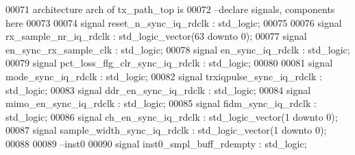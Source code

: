 \begin{DoxyCode}
00071 \textcolor{keywordflow}{architecture} arch \textcolor{keywordflow}{of} tx_path_top is
00072 \textcolor{keyword}{--declare signals,  components here}
00073 
00074 \textcolor{keywordflow}{signal} \textcolor{vhdlchar}{reset_n_sync_iq_rdclk}        \textcolor{vhdlchar}{:} \textcolor{comment}{std\_logic};
00075 
00076 \textcolor{keywordflow}{signal} \textcolor{vhdlchar}{rx_sample_nr_iq_rdclk}        \textcolor{vhdlchar}{:} \textcolor{comment}{std\_logic\_vector}\textcolor{vhdlchar}{(}\textcolor{vhdllogic}{}\textcolor{vhdllogic}{63} \textcolor{keywordflow}{downto} \textcolor{vhdllogic}{}\textcolor{vhdllogic}{0}\textcolor{vhdlchar}{)};
00077 \textcolor{keywordflow}{signal} \textcolor{vhdlchar}{en_sync_rx_sample_clk}        \textcolor{vhdlchar}{:} \textcolor{comment}{std\_logic};
00078 \textcolor{keywordflow}{signal} \textcolor{vhdlchar}{en_sync_iq_rdclk}             \textcolor{vhdlchar}{:} \textcolor{comment}{std\_logic};
00079 \textcolor{keywordflow}{signal} \textcolor{vhdlchar}{pct_loss_flg_clr_sync_iq_rdclk} \textcolor{vhdlchar}{:} \textcolor{comment}{std\_logic};
00080 
00081 \textcolor{keywordflow}{signal} \textcolor{vhdlchar}{mode_sync_iq_rdclk}           \textcolor{vhdlchar}{:} \textcolor{comment}{std\_logic};
00082 \textcolor{keywordflow}{signal} \textcolor{vhdlchar}{trxiqpulse_sync_iq_rdclk}     \textcolor{vhdlchar}{:} \textcolor{comment}{std\_logic}; 
00083 \textcolor{keywordflow}{signal} \textcolor{vhdlchar}{ddr_en_sync_iq_rdclk}         \textcolor{vhdlchar}{:} \textcolor{comment}{std\_logic};
00084 \textcolor{keywordflow}{signal} \textcolor{vhdlchar}{mimo_en_sync_iq_rdclk}        \textcolor{vhdlchar}{:} \textcolor{comment}{std\_logic};
00085 \textcolor{keywordflow}{signal} \textcolor{vhdlchar}{fidm_sync_iq_rdclk}           \textcolor{vhdlchar}{:} \textcolor{comment}{std\_logic};
00086 \textcolor{keywordflow}{signal} \textcolor{vhdlchar}{ch_en_sync_iq_rdclk}          \textcolor{vhdlchar}{:} \textcolor{comment}{std\_logic\_vector}\textcolor{vhdlchar}{(}\textcolor{vhdllogic}{}\textcolor{vhdllogic}{1} \textcolor{keywordflow}{downto} \textcolor{vhdllogic}{}\textcolor{vhdllogic}{0}\textcolor{vhdlchar}{)};
00087 \textcolor{keywordflow}{signal} \textcolor{vhdlchar}{sample_width_sync_iq_rdclk}   \textcolor{vhdlchar}{:} \textcolor{comment}{std\_logic\_vector}\textcolor{vhdlchar}{(}\textcolor{vhdllogic}{}\textcolor{vhdllogic}{1} \textcolor{keywordflow}{downto} \textcolor{vhdllogic}{}\textcolor{vhdllogic}{0}\textcolor{vhdlchar}{)};
00088 
00089 \textcolor{keyword}{--inst0}
00090 \textcolor{keywordflow}{signal} \textcolor{vhdlchar}{inst0_smpl_buff_rdempty}      \textcolor{vhdlchar}{:} \textcolor{comment}{std\_logic};

\end{DoxyCode}
